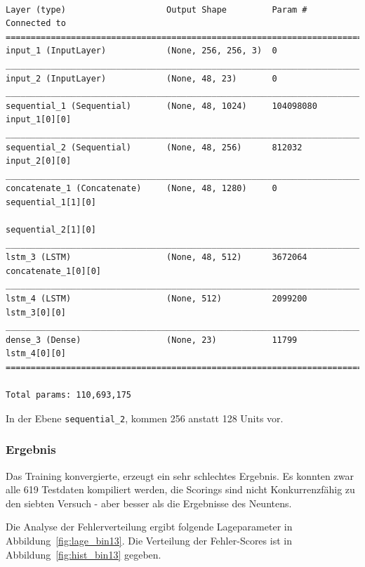 \documentclass[pdftex,a4paper,halfparskip, article]{scrartcl}
\begin{document}
\begin{verbatim}

Layer (type)                    Output Shape         Param #     Connected to
==============================================================================
input_1 (InputLayer)            (None, 256, 256, 3)  0
______________________________________________________________________________
input_2 (InputLayer)            (None, 48, 23)       0
______________________________________________________________________________
sequential_1 (Sequential)       (None, 48, 1024)     104098080   input_1[0][0]
______________________________________________________________________________
sequential_2 (Sequential)       (None, 48, 256)      812032      input_2[0][0]
______________________________________________________________________________
concatenate_1 (Concatenate)     (None, 48, 1280)     0           sequential_1[1][0]
                                                                 sequential_2[1][0]
______________________________________________________________________________
lstm_3 (LSTM)                   (None, 48, 512)      3672064     concatenate_1[0][0]
______________________________________________________________________________
lstm_4 (LSTM)                   (None, 512)          2099200     lstm_3[0][0]
______________________________________________________________________________
dense_3 (Dense)                 (None, 23)           11799       lstm_4[0][0]
==============================================================================

Total params: 110,693,175
\end{verbatim}

In der Ebene \texttt{sequential\_2}, kommen 256 anstatt 128 Units vor.

\subsubsection*{Ergebnis}

Das Training konvergierte, erzeugt ein sehr schlechtes Ergebnis. Es konnten zwar alle 619 Testdaten kompiliert werden, die Scorings sind nicht Konkurrenzfähig zu den siebten Versuch - aber besser als die Ergebnisse des Neuntens.

Die Analyse der Fehlerverteilung ergibt folgende Lageparameter in Abbildung~\ref{fig:lage_bin13}. Die Verteilung der Fehler-Scores ist in Abbildung~\ref{fig:hist_bin13} gegeben.
\end{document}
